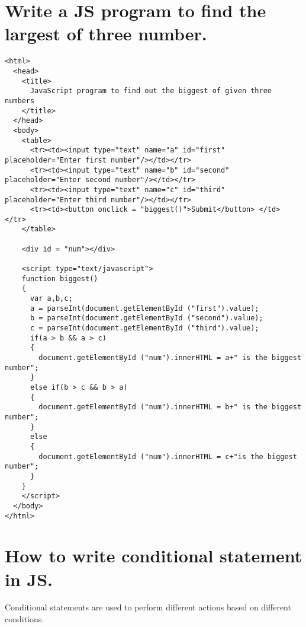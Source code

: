 \section{Write a JS program to find the largest of three number.}
\begin{lstlisting}
<html>
  <head>
    <title>
      JavaScript program to find out the biggest of given three numbers
    </title>
  </head>
  <body>
    <table>
      <tr><td><input type="text" name="a" id="first" placeholder="Enter first number"/></td></tr>
      <tr><td><input type="text" name="b" id="second" placeholder="Enter second number"/></td></tr>
      <tr><td><input type="text" name="c" id="third" placeholder="Enter third number"/></td></tr>
      <tr><td><button onclick = "biggest()">Submit</button> </td> </tr>
    </table>
    
    <div id = "num"></div>
  
    <script type="text/javascript">
    function biggest()
    {
      var a,b,c;
      a = parseInt(document.getElementById ("first").value);
      b = parseInt(document.getElementById ("second").value);
      c = parseInt(document.getElementById ("third").value);
      if(a > b && a > c)
      {
        document.getElementById ("num").innerHTML = a+" is the biggest number";
      }
      else if(b > c && b > a)
      {
        document.getElementById ("num").innerHTML = b+" is the biggest number";
      }
      else
      {
        document.getElementById ("num").innerHTML = c+"is the biggest number";
      }
    }
    </script>
  </body>
</html>
\end{lstlisting}
\section{How to write conditional statement in JS.}
Conditional statements are used to perform different actions based on different conditions.

